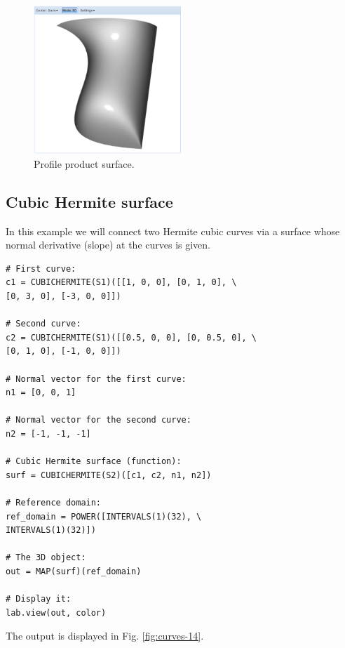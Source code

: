 \documentclass{article}
\begin{document}
\begin{figure}[!ht]
\begin{center}
\includegraphics[width=0.5\textwidth]{img/curves-13.png}
\end{center}
\vspace{-2mm}
\caption{Profile product surface.}
\label{fig:curves-13}
\end{figure}

\subsection{Cubic Hermite surface}

In this example we will connect two Hermite cubic curves
via a surface whose normal derivative (slope) at the curves
is given. 

\begin{verbatim}
# First curve:
c1 = CUBICHERMITE(S1)([[1, 0, 0], [0, 1, 0], \
[0, 3, 0], [-3, 0, 0]])

# Second curve:
c2 = CUBICHERMITE(S1)([[0.5, 0, 0], [0, 0.5, 0], \
[0, 1, 0], [-1, 0, 0]])

# Normal vector for the first curve:
n1 = [0, 0, 1]

# Normal vector for the second curve:
n2 = [-1, -1, -1]

# Cubic Hermite surface (function):
surf = CUBICHERMITE(S2)([c1, c2, n1, n2])

# Reference domain:
ref_domain = POWER([INTERVALS(1)(32), \
INTERVALS(1)(32)])

# The 3D object:
out = MAP(surf)(ref_domain)

# Display it:
lab.view(out, color)
\end{verbatim}
The output is displayed in Fig. \ref{fig:curves-14}.
\end{document}

